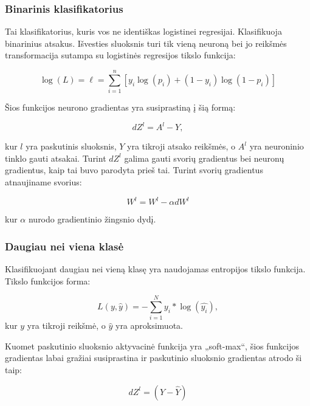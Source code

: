 \documentclass[a4paper, 12pt]{article}
\begin{document}
%
\subsubsection{Binarinis klasifikatorius}
%

Tai klasifikatorius, kuris vos ne identiškas logistinei regresijai. Klasifikuoja binarinius atsakus. Išvesties sluoksnis turi tik vieną neuroną bei jo reikšmės transformacija sutampa su logistinės regresijos tikslo funkcija:

\begin{equation}
\log (L)=\ell=\sum_{i=1}^{n}\left[y_{i} \log \left(p_{i}\right)+\left(1-y_{i}\right) \log \left(1-p_{i}\right)\right]
\end{equation}

Šios funkcijos neurono gradientas yra susiprastiną į šią formą:

\begin{equation}
d Z^{l}=A^{l}-Y,
\end{equation}

kur $l$ yra paskutinis sluoksnis, $Y$ yra tikroji atsako reikšmės, o $A^l$ yra neuroninio tinklo gauti atsakai. Turint $dZ^l$ galima gauti svorių gradientus bei neuronų gradientus, kaip tai buvo parodyta prieš tai. Turint svorių gradientus atnaujiname svorius:

\begin{equation}
W^{l}=W^{l}-\alpha dW^{l}
\end{equation}

kur $\alpha$ nurodo gradientinio žingsnio dydį.

%
\subsubsection{Daugiau nei viena klasė}
%

Klasifikuojant daugiau nei vieną klasę yra naudojamas entropijos tikslo funkcija. Tikslo funkcijos forma:

\begin{equation}
L(y, \hat{y})=-\sum_{i=1}^{N} y_i * \log (\hat{y_i}),
\end{equation}
kur $y$ yra tikroji reikšmė, o $\hat{y}$ yra aproksimuota.


Kuomet paskutinio sluoksnio aktyvacinė funkcija yra „soft-max“, šios funkcijos gradientas labai gražiai susiprastina ir paskutinio sluoksnio gradientas atrodo ši taip:

\begin{equation}
d Z^{l} = (Y- \hat{Y})
\end{equation}
\end{document}
